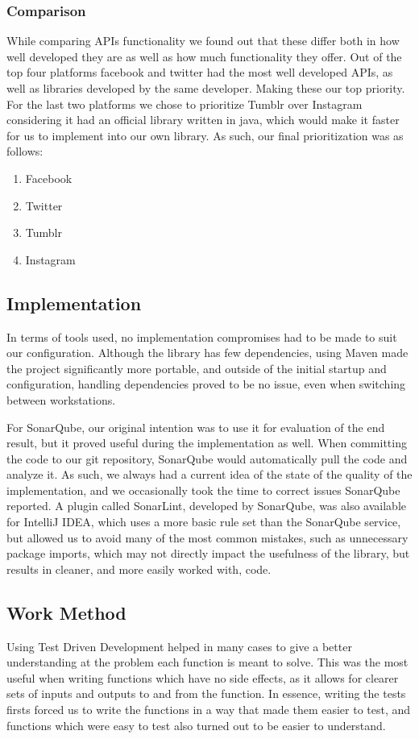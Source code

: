 \documentclass{sigchi-alternate}
\begin{document}
\subsubsection{Comparison}
While comparing APIs functionality we found out that these differ both in how well developed they are as well as how much functionality they offer. Out of the top four platforms facebook and twitter
had the most well developed APIs, as well as libraries developed by the same developer. Making these our top priority. For the last two platforms we chose to prioritize Tumblr over Instagram considering
it had an official library written in java, which would make it faster for us to implement into our own library. As such, our final prioritization was as follows:
\begin{enumerate}
	\item Facebook
	\item Twitter
	\item Tumblr
	\item Instagram
\end{enumerate}

\subsection{Implementation}
In terms of tools used, no implementation compromises had to be made to suit our configuration. Although the library has few dependencies, using Maven made the project significantly more portable, and outside of the
initial startup and configuration, handling dependencies proved to be no issue, even when switching between workstations.

For SonarQube, our original intention was to use it for evaluation of the end result, but it proved useful during the implementation as well. When committing the code to our git repository, SonarQube would automatically
pull the code and analyze it. As such, we always had a current idea of the state of the quality of the implementation, and we occasionally took the time to correct issues SonarQube reported. A plugin called SonarLint,
developed by SonarQube, was also available for IntelliJ IDEA, which uses a more basic rule set than the SonarQube service, but allowed us to avoid many of the most common mistakes, such as unnecessary package imports,
which may not directly impact the usefulness of the library, but results in cleaner, and more easily worked with, code.

\subsection{Work Method}
Using Test Driven Development helped in many cases to give a better understanding at the problem each function is meant to solve. This was the most useful when writing functions which have no side effects, as it allows
for clearer sets of inputs and outputs to and from the function. In essence, writing the tests firsts forced us to write the functions in a way that made them easier to test, and functions which were easy to test also
turned out to be easier to understand.
\end{document}
